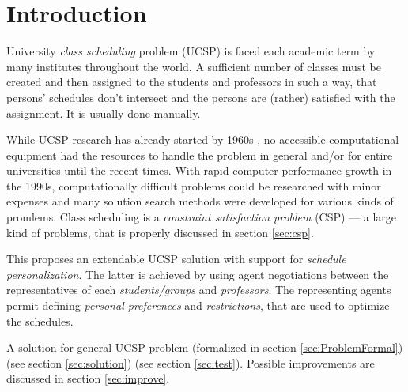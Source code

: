 \documentclass[ThesisDoc]{subfiles}
\begin{document}
\section{Introduction}

University \emph{class scheduling} problem (UCSP) is faced each academic term
by many institutes throughout the world. A sufficient number of classes must
be created and then assigned to the students and professors in such a way,
that persons' schedules don't intersect and the persons are (rather) satisfied
with the assignment. It is usually done manually.

While UCSP research has already started by 1960s ,
no accessible computational equipment had the resources to handle the problem
in general and/or for entire universities until the recent times.
With rapid computer performance growth in the 1990s, computationally
difficult problems could be researched with minor expenses and many
solution search methods were developed for various kinds of promlems.
Class scheduling is a \emph{constraint satisfaction problem} (CSP) ---
a large kind of problems, that is properly discussed in section \ref{sec:csp}.


\medskip

\noindent
This \thisdoc proposes an extendable UCSP solution with support for
\emph{schedule personalization}. The latter is achieved by using agent
negotiations between the representatives of each \emph{students/groups} and
\emph{professors}. The representing agents permit defining
\emph{personal preferences} and \emph{restrictions}, that are used to optimize
the schedules.

\medskip

\noindent
A solution for general UCSP problem
(formalized in section \ref{sec:ProblemFormal}) 
(see section \ref{sec:solution})  (see section \ref{sec:test}).
Possible improvements are discussed in section \ref{sec:improve}.
\end{document}
